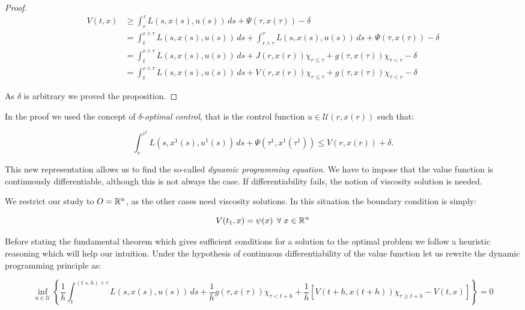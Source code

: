\begin{proposition}
\begin{proof}
    \begin{align*}
        V(t,x) & \geq \int_r^{\tau}L(s,x(s),u(s))\,ds+\Psi(\tau,x(\tau)) - \delta \\
        & = \int_t^{r\land\tau} L(s,x(s),u(s))\,ds+\int_{r\land\tau}^{\tau} L(s,x(s),u(s))\,ds+\Psi(\tau,x(\tau)) -\delta\\
        & = \int_t^{r\land\tau} L(s,x(s),u(s))\,ds+J(r,x(r))\chi_{r\leq\tau}+g(\tau,x(\tau))\chi_{\tau<r} - \delta\\
        & = \int_t^{r\land\tau} L(s,x(s),u(s))\,ds+V(r,x(r))\chi_{r\leq\tau}+g(\tau,x(\tau))\chi_{\tau<r} - \delta
    \end{align*}

    As $\delta$ is arbitrary we proved the proposition.
    \end{proof}
\end{proposition}


In the proof we used the concept of $\delta$-\textit{optimal control}, that is the control function $u\in\mathcal{U}(r,x(r))$ such that:

\[\int_r^{\tau^1}L(s,x^1(s),u^1(s))\,ds+\Psi(\tau^1,x^1(\tau^1))\leq V(r,x(r))+\delta.\]

This new representation allows us to find the so-called \textit{dynamic programming equation}. We have to impose that the value function 
is continuously differentiable, although this is not always the case. If differentiability fails, the notion of viscosity solution is needed. 

We restrict our study to $O=\mathbb{R}^n$, as the other cases need viscosity solutions. In this situation the boundary condition is simply:

\begin{equation}\label{1-2-boundcondR}
    V(t_1,x)=\psi(x)\,\forall x\in\R^n
\end{equation}

Before stating the fundamental theorem which gives sufficient conditions 
for a solution to the optimal problem we follow a heuristic reasoning which will help our intuition. Under the hypothesis of continuous differentiability of the value function 
let us rewrite the dynamic programming principle as:

\begin{equation}
    \inf_{u\in\mathcal{U}}\left\{\frac{1}{h}\int_t^{(t+h)\land\tau} L(s,x(s),u(s))\,ds + \frac{1}{h}g(\tau,x(\tau))\chi_{\tau<t+h} + \frac{1}{h}\left[V(t+h,x(t+h))\chi_{\tau\geq t+h} - V(t,x)\right]\right\}=0
\end{equation}

